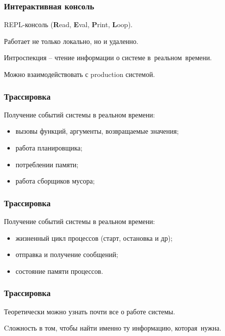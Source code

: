 \documentclass[10pt]{beamer}
\begin{document}
\begin{frame}
  \frametitle{Интерактивная консоль}
  REPL-консоль (\textbf{R}ead, \textbf{E}val, \textbf{P}rint, \textbf{L}oop).
  \par \bigskip
  Работает не только локально, но и удаленно.
  \par \bigskip
  Интроспекция -- чтение информации о системе в~реальном~времени.
  \par \bigskip
  Можно взаимодействовать с production системой.
\end{frame}

\begin{frame}
  \frametitle{Трассировка}
  Получение событий системы в реальном времени:
  \begin{itemize}
  \item вызовы функций, аргументы, возвращаемые значения;
  \item работа планировщика;
  \item потреблении памяти;
  \item работа сборщиков мусора;
  \end{itemize}
\end{frame}

\begin{frame}
  \frametitle{Трассировка}
  Получение событий системы в реальном времени:
  \begin{itemize}
  \item жизненный цикл процессов (старт, остановка и др);
  \item отправка и получение сообщений;
  \item состояние памяти процессов.
  \end{itemize}
\end{frame}

\begin{frame}
  \frametitle{Трассировка}
  Теоретически можно узнать почти все о работе системы.
  \par \bigskip
  Cложность в том, чтобы найти именно ту информацию, которая~нужна.
\end{frame}
\end{document}
